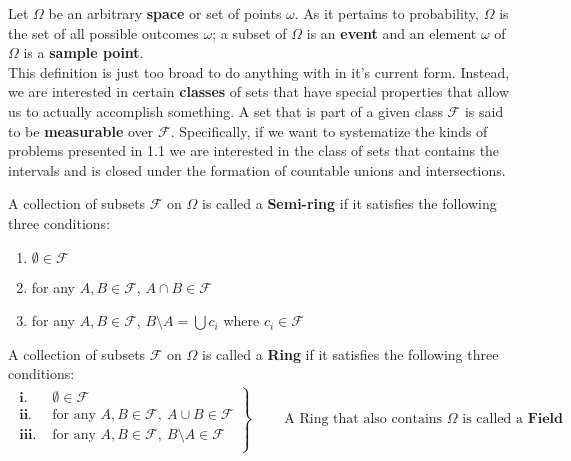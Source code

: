  \quad 


Let $\Omega$ be an arbitrary \textbf{space} or set of points $\omega$. As it pertains to probability, $\Omega$ is the set of all possible outcomes $\omega$; a subset of $\Omega$ is an \textbf{event} and an element $\omega$ of $\Omega$ is a \textbf{sample point}. \\[10pt]
This definition is just too broad to do anything with in it's current form. Instead, we are interested in certain \textbf{classes} of sets that have special properties that allow us to actually accomplish something. A set that is part of a given class $\mathcal{F}$ is said to be \textbf{measurable} over $\mathcal{F}$. Specifically, if we want to systematize the kinds of problems presented in 1.1 we are interested in the class of sets that contains the intervals and is closed under the formation of countable unions and intersections.

\vspace{2ex}

A collection of subsets $\mathcal{F}$ on $\Omega$ is called a \textbf{Semi-ring} if it satisfies the following three conditions:
\begin{enumerate}[label=\textbf{\roman*.}, topsep=0pt, itemsep=-3pt]
    \item $\emptyset \in \mathcal{F}$
    \item for any $A,B\in \mathcal{F}$, $A\cap B \in \mathcal{F}$
    \item for any $A,B\in \mathcal{F}$, $B \setminus A = \bigcup c_i$ where $c_i \in \mathcal{F}$ 
\end{enumerate}
\vspace{2ex}
A collection of subsets $\mathcal{F}$ on $\Omega$ is called a \textbf{Ring} if it satisfies the following three conditions:
\vspace{-10pt}
\[
\begin{split}
    \left.
    \begin{aligned}
        \textbf{i. } & \emptyset \in \mathcal{F}\\
        \textbf{ii. } & \text{for any }A,B\in \mathcal{F},\ A\cup B \in \mathcal{F}\\
        \textbf{iii. } & \text{for any }A,B\in \mathcal{F},\ B \setminus A \in \mathcal{F}\\
    \end{aligned}
    \right\}
\end{split}
\begin{split}
    \begin{aligned}
        & \text{ A Ring that also contains } \Omega \text{ is called a } \textbf{Field}
    \end{aligned}
\end{split}
\]

